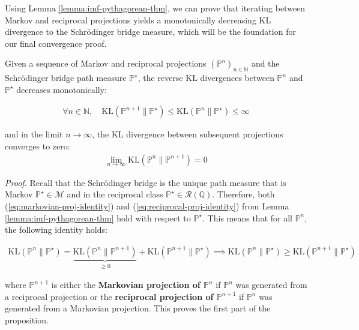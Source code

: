 \documentclass{article}
\begin{document}
Using Lemma \ref{lemma:imf-pythagorean-thm}, we can prove that iterating between Markov and reciprocal projections yields a monotonically decreasing KL divergence to the Schrödinger bridge measure, which will be the foundation for our final convergence proof.

\begin{proposition}\label{prop:imf-monotone-decrease}
    Given a sequence of Markov and reciprocal projections $(\mathbb{P}^n)_{n \in \mathbb{N}}$ and the Schrödinger bridge path measure $\mathbb{P}^\star$, the reverse KL divergences between $\mathbb{P}^n$ and $\mathbb{P}^\star$ decreases monotonically:
    \begin{small}
    \begin{align}
        \forall n \in \mathbb{N}, \quad \text{KL}(\mathbb{P}^{n+1}\|\mathbb{P}^\star)\leq \text{KL}(\mathbb{P}^{n}\|\mathbb{P}^\star)\leq \infty
    \end{align}
    \end{small}
    and in the limit $n\to \infty$, the KL divergence between subsequent projections converges to zero:
    \begin{align}
        \lim_{n \to \infty}\text{KL}(\mathbb{P}^{n}\|\mathbb{P}^{n+1})= 0
    \end{align}
\end{proposition}

\textit{Proof.} Recall that the Schrödinger bridge is the unique path measure that is Markov $\mathbb{P}^\star\in \mathcal{M}$ and in the reciprocal class $\mathbb{P}^\star\in \mathcal{R}(\mathbb{Q})$. Therefore, both (\ref{eq:markovian-proj-identity}) and (\ref{eq:reciprocal-proj-identity}) from Lemma \ref{lemma:imf-pythagorean-thm} hold with respect to $\mathbb{P}^\star$. This means that for all $\mathbb{P}^n$, the following identity holds:
\begin{small}
\begin{align}
    \text{KL}(\mathbb{P}^n\|\mathbb{P}^\star)=\underbrace{\text{KL}(\mathbb{P}^{n}\|\mathbb{P}^{n+1})}_{\geq 0}+ \text{KL}(\mathbb{P}^{n+1}\|\mathbb{P}^\star)\implies \boxed{\text{KL}(\mathbb{P}^n\|\mathbb{P}^\star)\geq \text{KL}(\mathbb{P}^{n+1}\|\mathbb{P}^\star)}\label{eq:pythag-proof2}
\end{align}
\end{small}
where $\mathbb{P}^{n+1}$ is either the \textbf{Markovian projection of $\mathbb{P}^n$} if $\mathbb{P}^n$ was generated from a reciprocal projection or the \textbf{reciprocal projection of $\mathbb{P}^{n+1}$} if $\mathbb{P}^n$ was generated from a Markovian projection. This proves the first part of the proposition. 
\end{document}
